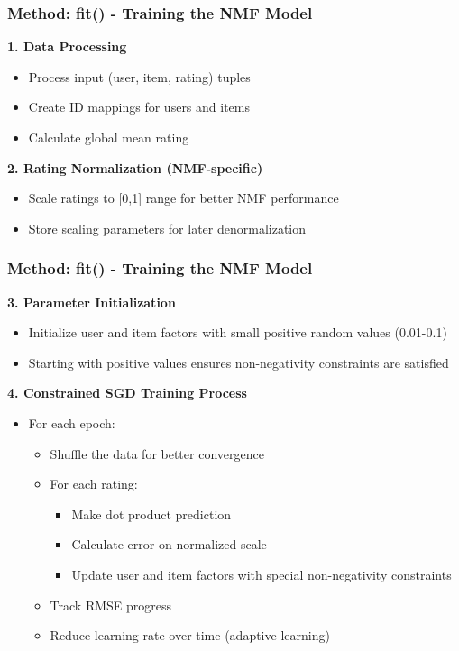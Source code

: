 \documentclass{beamer}
\begin{document}
\begin{frame}
\frametitle{Method: fit() - Training the NMF Model}

    \textbf{1. Data Processing}
    \begin{itemize}
        \item Process input (user, item, rating) tuples
        \item Create ID mappings for users and items
        \item Calculate global mean rating
    \end{itemize}

    \vspace{1cm}
    
    \textbf{2. Rating Normalization (NMF-specific)}
    \begin{itemize}
        \item Scale ratings to [0,1] range for better NMF performance
        \item Store scaling parameters for later denormalization
    \end{itemize}
\end{frame}

\begin{frame}
\frametitle{Method: fit() - Training the NMF Model}
    \textbf{3. Parameter Initialization}
    \begin{itemize}
        \item Initialize user and item factors with small positive random values (0.01-0.1)
        \item Starting with positive values ensures non-negativity constraints are satisfied
    \end{itemize}
    
    \textbf{4. Constrained SGD Training Process}
    \begin{itemize}
        \item For each epoch:
        \begin{itemize}
            \item Shuffle the data for better convergence
            \item For each rating:
            \begin{itemize}
                \item Make dot product prediction
                \item Calculate error on normalized scale
                \item Update user and item factors with special non-negativity constraints
            \end{itemize}
            \item Track RMSE progress
            \item Reduce learning rate over time (adaptive learning)
        \end{itemize}
    \end{itemize}
\end{frame}
\end{document}
